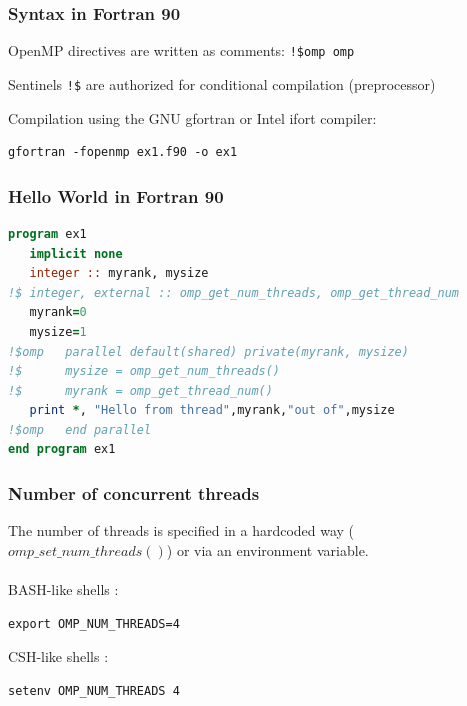 \begin{frame}[containsverbatim]
  \frametitle{Syntax in Fortran 90}

  \begin{block}{}
    OpenMP directives are written as comments: \texttt{!\$omp omp}
  \end{block}
  \begin{block}{}
    Sentinels \texttt{!\$} are authorized for conditional compilation  (preprocessor)
  \end{block}


  Compilation using the GNU gfortran or Intel ifort compiler:
\begin{verbatim}
gfortran -fopenmp ex1.f90 -o ex1
\end{verbatim}
\end{frame}



\begin{frame}[containsverbatim]
  \frametitle{Hello World in Fortran 90}

  \begin{lstlisting}[language=Fortran,frame=lines]
program ex1
   implicit none
   integer :: myrank, mysize
!$ integer, external :: omp_get_num_threads, omp_get_thread_num
   myrank=0
   mysize=1
!$omp   parallel default(shared) private(myrank, mysize)
!$      mysize = omp_get_num_threads()
!$      myrank = omp_get_thread_num()
   print *, "Hello from thread",myrank,"out of",mysize
!$omp   end parallel
end program ex1
\end{lstlisting}
\end{frame}

\begin{frame}[containsverbatim]
  \frametitle{Number of concurrent threads}

  The number of threads is specified in a hardcoded way ($omp\_set\_num\_threads()$) or via an environment variable.
  \\~\\

  BASH-like shells :

\begin{verbatim}
export OMP_NUM_THREADS=4
\end{verbatim}

  CSH-like shells :

\begin{verbatim}
setenv OMP_NUM_THREADS 4
\end{verbatim}
\end{frame}


